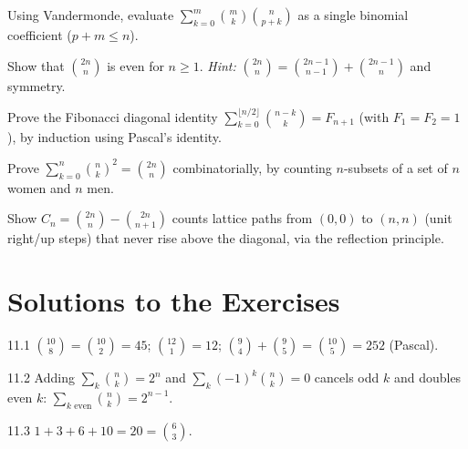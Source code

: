 \begin{exercise}{\medium}
Using Vandermonde, evaluate $\sum_{k=0}^{m} \binom{m}{k}\binom{n}{p+k}$ as a
single binomial coefficient ($p + m \le n$).
\end{exercise}

\begin{exercise}{\medium}
Show that $\binom{2n}{n}$ is even for $n \geq 1$.
\emph{Hint: } $\binom{2n}{n} = \binom{2n-1}{n-1} + \binom{2n-1}{n}$ and
symmetry.
\end{exercise}

\begin{exercise}{\hard}
Prove the Fibonacci diagonal identity
$\sum_{k=0}^{\lfloor n/2 \rfloor} \binom{n-k}{k} = F_{n+1}$
(with $F_1 = F_2 = 1$), by induction using Pascal's identity.
\end{exercise}

\begin{exercise}{\hard}
Prove $\sum_{k=0}^{n} \binom{n}{k}^2 = \binom{2n}{n}$ combinatorially, by
counting $n$-subsets of a set of $n$ women and $n$ men.
\end{exercise}

\begin{exercise}{\hard}
Show $C_n = \binom{2n}{n} - \binom{2n}{n+1}$ counts lattice paths from
$(0,0)$ to $(n,n)$ (unit right/up steps) that never rise above the diagonal,
via the reflection principle.
\end{exercise}

\section*{Solutions to the Exercises}

\begin{solution}{11.1}
$\binom{10}{8} = \binom{10}{2} = 45$; $\binom{12}{1} = 12$;
$\binom{9}{4} + \binom{9}{5} = \binom{10}{5} = 252$ (Pascal).
\end{solution}

\begin{solution}{11.2}
Adding $\sum_k \binom{n}{k} = 2^n$ and $\sum_k (-1)^k\binom{n}{k} = 0$
cancels odd $k$ and doubles even $k$:
$\sum_{k\text{ even}} \binom{n}{k} = 2^{n-1}$.
\end{solution}

\begin{solution}{11.3}
$1 + 3 + 6 + 10 = 20 = \binom{6}{3}$. \checkmark
\end{solution}

